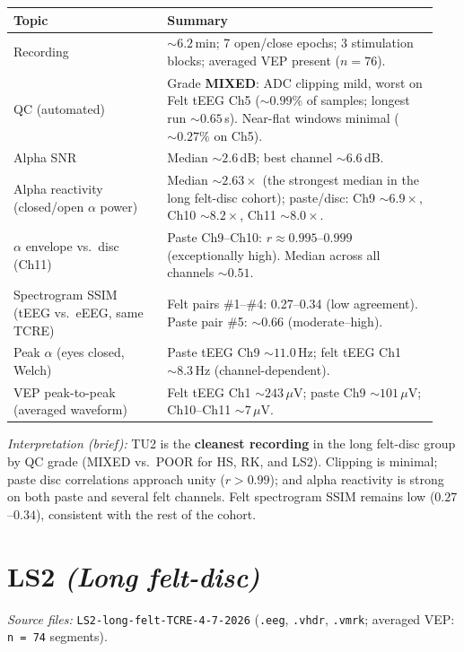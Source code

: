 \documentclass[11pt]{article}
\begin{document}
\begin{table}[h]
  \centering
  \small
  \begin{tabular}{@{}p{0.34\linewidth}p{0.60\linewidth}@{}}
    \toprule
    \textbf{Topic} & \textbf{Summary} \\
    \midrule
    Recording & ${\sim}6.2$\,min; 7 open/close epochs; 3 stimulation blocks; averaged VEP present ($n=76$). \\
    QC (automated) & Grade \textbf{MIXED}: ADC clipping mild, worst on Felt tEEG Ch5 (${\sim}0.99\%$ of samples; longest run ${\sim}0.65$\,s). Near-flat windows minimal (${\sim}0.27\%$ on Ch5). \\
    Alpha SNR & Median ${\sim}2.6$\,dB; best channel ${\sim}6.6$\,dB. \\
    Alpha reactivity (closed/open $\alpha$ power) & Median ${\sim}2.63\times$ (the strongest median in the long felt-disc cohort); paste/disc: Ch9 ${\sim}6.9\times$, Ch10 ${\sim}8.2\times$, Ch11 ${\sim}8.0\times$. \\
    $\alpha$ envelope vs.\ disc (Ch11) & Paste Ch9--Ch10: $r \approx 0.995$--$0.999$ (exceptionally high). Median across all channels ${\sim}0.51$. \\
    Spectrogram SSIM (tEEG vs.\ eEEG, same TCRE) & Felt pairs \#1--\#4: 0.27--0.34 (low agreement). Paste pair \#5: ${\sim}0.66$ (moderate--high). \\
    Peak $\alpha$ (eyes closed, Welch) & Paste tEEG Ch9 ${\sim}11.0$\,Hz; felt tEEG Ch1 ${\sim}8.3$\,Hz (channel-dependent). \\
    VEP peak-to-peak (averaged waveform) & Felt tEEG Ch1 ${\sim}243$\,$\mu$V; paste Ch9 ${\sim}101$\,$\mu$V; Ch10--Ch11 ${\sim}7$\,$\mu$V. \\
    \bottomrule
  \end{tabular}
\end{table}

\noindent\textit{Interpretation (brief):} TU2 is the \textbf{cleanest recording} in the long felt-disc group by QC grade (MIXED vs.\ POOR for HS, RK, and LS2). Clipping is minimal; paste disc correlations approach unity ($r > 0.99$); and alpha reactivity is strong on both paste and several felt channels. Felt spectrogram SSIM remains low ($0.27$--$0.34$), consistent with the rest of the cohort.

\section*{LS2 \textnormal{\textit{(Long felt-disc)}}}
\textit{Source files:} \texttt{LS2-long-felt-TCRE-4-7-2026} (\texttt{.eeg}, \texttt{.vhdr}, \texttt{.vmrk}; averaged VEP: \texttt{n\,=\,74} segments).
\end{document}
